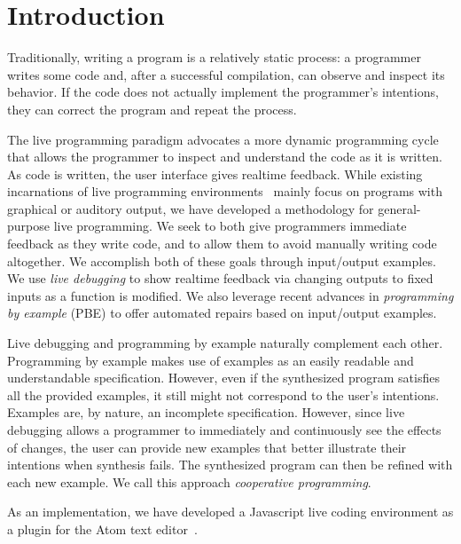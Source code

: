 \section{Introduction}
\label{sec:intro}


Traditionally, writing a program is a relatively static process: a programmer writes some code and, after a successful compilation, can observe and inspect its behavior. If the code does not actually implement the programmer's intentions, they can correct the program and repeat the process.

The live programming paradigm advocates a more dynamic programming cycle that allows the programmer to inspect and understand the code as it is written. As code is written, the user interface gives realtime feedback.  While existing incarnations of live programming environments~\cite{victor2012, chugh2016programmatic, brown2009interacting} mainly focus on programs with graphical or auditory output, we have developed a methodology for general-purpose live programming.
We seek to both give programmers immediate feedback as they write code,
and to allow them to avoid manually writing code altogether.
We accomplish both of these goals through input/output examples.
We use \textit{live debugging} to show realtime feedback via changing outputs to fixed inputs as a function is modified. 
We also leverage recent advances in \textit{programming by example} (PBE) to offer automated repairs based on input/output examples.

Live debugging and programming by example naturally complement each other.
Programming by example makes use of examples as an easily readable and understandable specification. However, even if the synthesized program satisfies all the provided examples, it still might not correspond to the user's intentions. Examples are, by nature, an incomplete specification. However, since live debugging allows a programmer to immediately and continuously see the effects of changes, the user can provide new examples that better illustrate their intentions when synthesis fails. The synthesized program can then be refined with each new example. We call this approach {\emph{cooperative programming}}.

As an implementation, we have developed a Javascript live coding environment as a plugin for the Atom text editor~\cite{Atom}.


